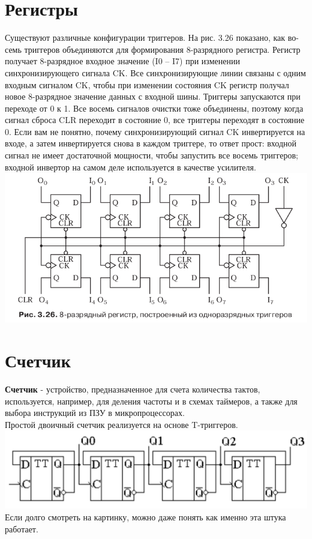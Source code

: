 \documentclass[12pt, a4paper]{article}
\begin{document}
\section{Регистры}
Существуют различные конфигурации триггеров. На рис. 3.26 показано, как во-
семь триггеров объединяются для формирования 8-разрядного регистра. Регистр
получает 8-разрядное входное значение (I0 – I7) при изменении синхронизирующего сигнала CK. Все синхронизирующие линии связаны с одним входным
сигналом CK, чтобы при изменении состояния CK регистр получал новое 8-разрядное значение данных с входной шины. Триггеры запускаются при переходе от 0 к 1. Все восемь сигналов очистки тоже объединены, поэтому когда сигнал сброса CLR переходит в состояние 0, все триггеры переходят в состояние 0. Если вам не понятно, почему синхронизирующий сигнал CK инвертируется на входе, а затем инвертируется снова в каждом триггере, то ответ прост: входной сигнал не имеет достаточной мощности, чтобы запустить все восемь триггеров; входной инвертор на самом деле используется в качестве усилителя.\\
\includegraphics[scale=0.6]{./images/3_26.png}
\section{Счетчик}
\textbf{Счетчик} - устройство, предназначенное для счета количества тактов, используется, например, для деления частоты и в схемах таймеров, а также для выбора инструкций из ПЗУ в микропроцессорах.\\
Простой двоичный счетчик реализуется на основе T-триггеров.\\
\includegraphics[scale=0.4]{./images/3_27}\\
Если долго смотреть на картинку, можно даже понять как именно эта штука работает.
\end{document}
